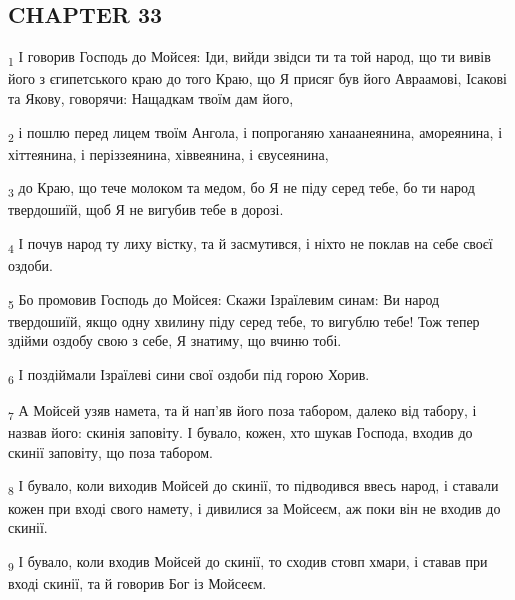 \subsection{CHAPTER 33}
\begin{tcolorbox}
\textsubscript{1} І говорив Господь до Мойсея: Іди, вийди звідси ти та той народ, що ти вивів його з єгипетського краю до того Краю, що Я присяг був його Авраамові, Ісакові та Якову, говорячи: Нащадкам твоїм дам його,
\end{tcolorbox}
\begin{tcolorbox}
\textsubscript{2} і пошлю перед лицем твоїм Ангола, і попроганяю ханаанеянина, амореянина, і хіттеянина, і періззеянина, хіввеянина, і євусеянина,
\end{tcolorbox}
\begin{tcolorbox}
\textsubscript{3} до Краю, що тече молоком та медом, бо Я не піду серед тебе, бо ти народ твердошиїй, щоб Я не вигубив тебе в дорозі.
\end{tcolorbox}
\begin{tcolorbox}
\textsubscript{4} І почув народ ту лиху вістку, та й засмутився, і ніхто не поклав на себе своєї оздоби.
\end{tcolorbox}
\begin{tcolorbox}
\textsubscript{5} Бо промовив Господь до Мойсея: Скажи Ізраїлевим синам: Ви народ твердошиїй, якщо одну хвилину піду серед тебе, то вигублю тебе! Тож тепер здійми оздобу свою з себе, Я знатиму, що вчиню тобі.
\end{tcolorbox}
\begin{tcolorbox}
\textsubscript{6} І поздіймали Ізраїлеві сини свої оздоби під горою Хорив.
\end{tcolorbox}
\begin{tcolorbox}
\textsubscript{7} А Мойсей узяв намета, та й нап'яв його поза табором, далеко від табору, і назвав його: скинія заповіту. І бувало, кожен, хто шукав Господа, входив до скинії заповіту, що поза табором.
\end{tcolorbox}
\begin{tcolorbox}
\textsubscript{8} І бувало, коли виходив Мойсей до скинії, то підводився ввесь народ, і ставали кожен при вході свого намету, і дивилися за Мойсеєм, аж поки він не входив до скинії.
\end{tcolorbox}
\begin{tcolorbox}
\textsubscript{9} І бувало, коли входив Мойсей до скинії, то сходив стовп хмари, і ставав при вході скинії, та й говорив Бог із Мойсеєм.
\end{tcolorbox}
